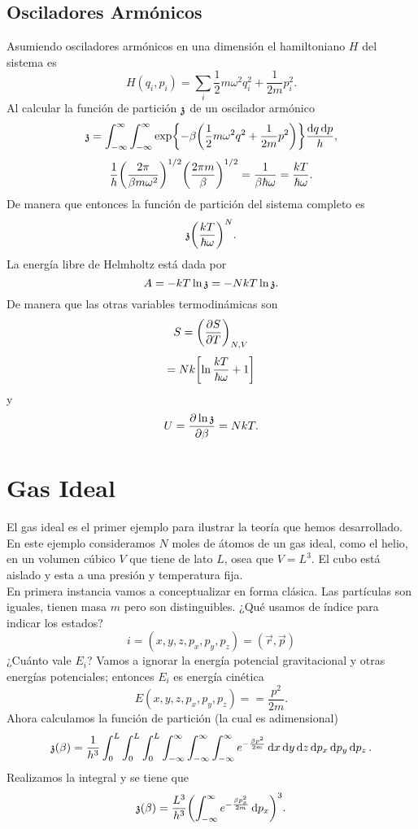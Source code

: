 \section{Osciladores Armónicos}
Asumiendo osciladores armónicos en una dimensión el hamiltoniano $H$ del sistema es
    $$ H(q_i ,p_i) = \sum _i \frac{1}{2} m\omega ^2 q_i ^2 + \frac{1}{2m} p_i ^2 . $$
Al calcular la función de partición $\mathfrak{z}$ de un oscilador armónico 
    $$ \mathfrak{z} = \int _{-\infty} ^\infty \int _{-\infty} ^\infty \exp{-\beta \qty(\frac{1}{2} m\omega ^2 q^2 + \frac{1}{2m} p^2)} \frac{\dd{q} \dd{p}}{h}, $$
    $$ \frac{1}{h} \qty(\frac{2\pi}{\beta m\omega ^2})^{1/2} \qty(\frac{2\pi m}{\beta})^{1/2} = \frac{1}{\beta \hbar \omega} = \frac{kT}{\hbar \omega}. $$
De manera que entonces la función de partición del sistema completo es
    $$ \mathfrak{z} \qty(\frac{kT}{\hbar \omega})^N. $$
La energía libre de Helmholtz está dada por
    $$ A = -kT\ln{\mathfrak{z}} = -NkT \ln{\mathfrak{z}}. $$
De manera que las otras variables termodinámicas son
    $$ S = \qty(\pdv{S}{T})_{N,V} $$
    $$ = Nk\qty[\ln{\frac{kT}{\hbar \omega}} + 1] $$
y
    $$ U = \pdv{\ln{\mathfrak{z}}}{\beta} = NkT. $$
    
    
    
\chapter{Gas Ideal}

El gas ideal es el primer ejemplo para ilustrar la teoría que hemos desarrollado. En este ejemplo consideramos $N$ moles de átomos de un gas ideal, como el helio, en un volumen cúbico $V$ que tiene de lato $L$, osea que $V = L^3$. El cubo está aislado y esta a una presión y temperatura fija. \\
En primera instancia vamos a conceptualizar en forma clásica. Las partículas son iguales, tienen masa $m$ pero son distinguibles. ¿Qué usamos de índice para indicar los estados?
	$$ i = (x,y,z,p_x,p_y,p_z) = (\vec{r},\vec{p}) $$
¿Cuánto vale $E_i$? Vamos a ignorar la energía potencial gravitacional y otras energías potenciales; entonces $E_i$ es energía cinética
	$$ E(x,y,z,p_x,p_y,p_z) = = \frac{p^2}{2m} . $$
Ahora calculamos la función de partición (la cual es adimensional)
	$$ \mathfrak{z} (\beta) =  \frac{1}{h^3} \int _0 ^L \int _0 ^L \int _0 ^L \int _{-\infty} ^\infty \int _{-\infty} ^\infty \int _{-\infty} ^\infty e^{-\frac{\beta p^2}{2m}} \dd{x} \dd{y} \dd{z} \dd{p_x} \dd{p_y} \dd{p_z}. $$
Realizamos la integral y se tiene que
	$$ \mathfrak{z} (\beta) = \frac{L^3}{h^3} \qty(\int _{-\infty} ^\infty e^{-\frac{\beta p_x ^2}{2m}} \dd{p_x})^3. $$
	
































